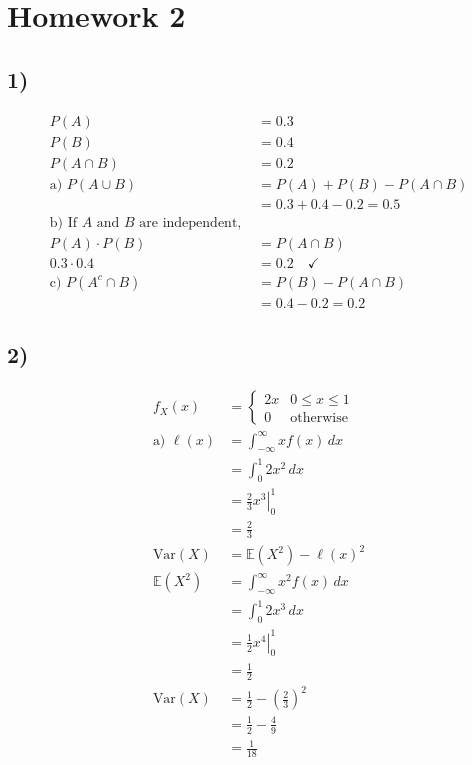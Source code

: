 \documentclass{article}
\begin{document}
\section*{Homework 2}

\subsection*{1)}
\begin{align*}
P(A) &= 0.3 \\
P(B) &= 0.4 \\
P(A \cap B) &= 0.2 \\
\text{a) } P(A \cup B) &= P(A) + P(B) - P(A \cap B) \\
&= 0.3 + 0.4 - 0.2 = 0.5 \\
\text{b) If } A \text{ and } B \text{ are independent, } & \\
P(A) \cdot P(B) &= P(A \cap B) \\
0.3 \cdot 0.4 &= 0.2 \quad \checkmark \\
\text{c) } P(A^c \cap B) &= P(B) - P(A \cap B) \\
&= 0.4 - 0.2 = 0.2
\end{align*}

\subsection*{2)}
\begin{align*}
f_X(x) &=
\begin{cases} 
2x & 0 \leq x \leq 1 \\
0 & \text{otherwise} 
\end{cases} \\
\text{a) } \ell(x) &= \int_{-\infty}^{\infty} x f(x) \, dx \\
&= \int_0^1 2x^2 \, dx \\
&= \left. \frac{2}{3} x^3 \right|_0^1 \\
&= \frac{2}{3} \\
\text{Var}(X) &= \mathbb{E}(X^2) - \ell(x)^2 \\
\mathbb{E}(X^2) &= \int_{-\infty}^{\infty} x^2 f(x) \, dx \\
&= \int_0^1 2x^3 \, dx \\
&= \left. \frac{1}{2} x^4 \right|_0^1 \\
&= \frac{1}{2} \\
\text{Var}(X) &= \frac{1}{2} - \left( \frac{2}{3} \right)^2 \\
&= \frac{1}{2} - \frac{4}{9} \\
&= \frac{1}{18}
\end{align*}
\end{document}
